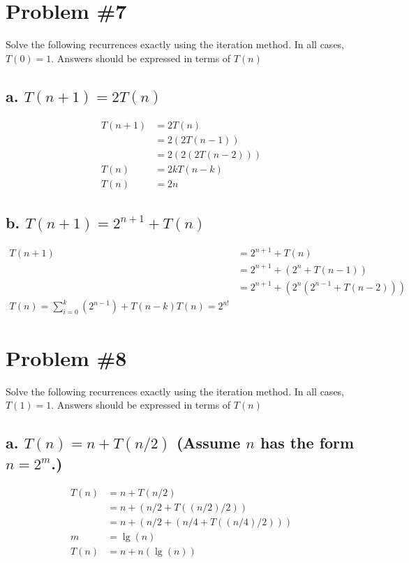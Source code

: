 \documentclass{article}
\begin{document}
\section*{Problem \#7}
Solve the following recurrences exactly using the iteration method. In all cases, \(T(0) = 1\).
Answers should be expressed in terms of \(T(n)\)

\subsection*{a. \(T(n + 1) = 2T(n)\)}
\begin{subequations}
  \begin{align}
    T(n + 1) &= 2T(n) \\
    &= 2(2T(n - 1)) \\
    &= 2(2(2T(n - 2))) \\
    T(n) &= 2kT(n - k) \\
    T(n) &= 2n
  \end{align}
\end{subequations}

\subsection*{b. \(T(n + 1) = 2^{n + 1} + T(n)\)}
\begin{subequations}
  \begin{align}
    T(n + 1) &= 2^{n + 1} + T(n) \\
    &= 2^{n + 1} + (2^{n} + T(n - 1)) \\
    &= 2^{n + 1} + (2^{n} (2^{n - 1} + T(n - 2))) \\
    T(n) = \sum_{i=0}^{k}(2^{n - 1}) + T(n - k)
    T(n) = 2^{n!}
  \end{align}
\end{subequations}

\section*{Problem \#8}
Solve the following recurrences exactly using the iteration method. In all cases, \(T(1) = 1\).
Answers should be expressed in terms of \(T(n)\)

\subsection*{a. \(T(n) = n + T(n/2)\) (Assume \(n\) has the form \(n = 2^m\).)}
\begin{subequations}
  \begin{align}
    T(n) &= n + T(n/2) \\
    &= n + (n/2 + T((n/2)/2)) \\
    &= n + (n/2 + (n/4 + T((n/4)/2))) \\
    m &= \lg(n) \\
    T(n) &= n + n(\lg(n))
  \end{align}
\end{subequations}
\end{document}
